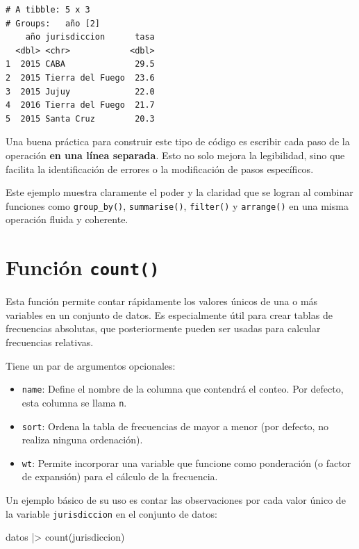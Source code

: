 \documentclass[
  spanish,
  a4paper,
]{scrbook}
\newenvironment{Shaded}{\begin{snugshade}}{\end{snugshade}}
\newcommand{\FunctionTok}[1]{\textcolor[rgb]{0.28,0.35,0.67}{#1}}
\newcommand{\NormalTok}[1]{\textcolor[rgb]{0.00,0.23,0.31}{#1}}
\newcommand{\SpecialCharTok}[1]{\textcolor[rgb]{0.37,0.37,0.37}{#1}}
\begin{document}
\begin{verbatim}
# A tibble: 5 x 3
# Groups:   año [2]
    año jurisdiccion      tasa
  <dbl> <chr>            <dbl>
1  2015 CABA              29.5
2  2015 Tierra del Fuego  23.6
3  2015 Jujuy             22.0
4  2016 Tierra del Fuego  21.7
5  2015 Santa Cruz        20.3
\end{verbatim}

Una buena práctica para construir este tipo de código es escribir cada
paso de la operación \textbf{en una línea separada}. Esto no solo mejora
la legibilidad, sino que facilita la identificación de errores o la
modificación de pasos específicos.

Este ejemplo muestra claramente el poder y la claridad que se logran al
combinar funciones como \texttt{group\_by()}, \texttt{summarise()},
\texttt{filter()} y \texttt{arrange()} en una misma operación fluida y
coherente.

\section{\texorpdfstring{Función
\texttt{count()}}{Función count()}}\label{funciuxf3n-count}

Esta función permite contar rápidamente los valores únicos de una o más
variables en un conjunto de datos. Es especialmente útil para crear
tablas de frecuencias absolutas, que posteriormente pueden ser usadas
para calcular frecuencias relativas.

Tiene un par de argumentos opcionales:

\begin{itemize}
\item
  \texttt{name}: Define el nombre de la columna que contendrá el conteo.
  Por defecto, esta columna se llama \texttt{n}.
\item
  \texttt{sort}: Ordena la tabla de frecuencias de mayor a menor (por
  defecto, no realiza ninguna ordenación).
\item
  \texttt{wt}: Permite incorporar una variable que funcione como
  ponderación (o factor de expansión) para el cálculo de la frecuencia.
\end{itemize}

Un ejemplo básico de su uso es contar las observaciones por cada valor
único de la variable \texttt{jurisdiccion} en el conjunto de datos:

\begin{Shaded}
\begin{Highlighting}[]
\NormalTok{datos }\SpecialCharTok{|\textgreater{}}
  \FunctionTok{count}\NormalTok{(jurisdiccion)}
\end{Highlighting}
\end{Shaded}
\end{document}
